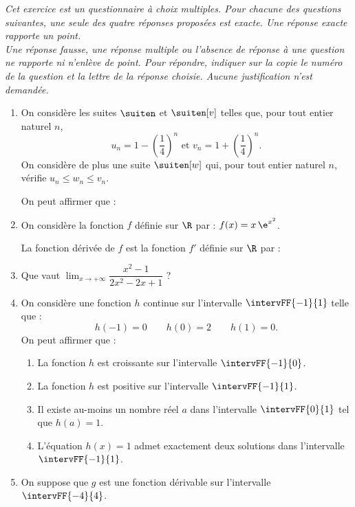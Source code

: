 \textit{Cet exercice est un questionnaire à choix multiples. Pour chacune des questions suivantes, une seule des quatre réponses proposées est exacte. Une réponse exacte rapporte un point.\\
	Une réponse fausse, une réponse multiple ou l’absence de réponse à une question ne rapporte ni n’enlève de point. Pour répondre, indiquer sur la copie le numéro de la question et la lettre de la réponse choisie. Aucune justification n’est demandée.}

\begin{enumerate}
	\item On considère les suites $\suiten$ et $\suiten[v]$ telles que, pour tout entier naturel $n$, \[ u_n=1-\left(\dfrac14\right)^n \text{ et } v_n = 1+\left(\dfrac14\right)^n. \]%
	On considère de plus une suite $\suiten[w]$ qui, pour tout entier naturel $n$, vérifie $u_n \leqslant w_n \leqslant v_n$.
	
	On peut affirmer que :
	
	\item On considère la fonction $f$ définie sur $\R$ par : $f(x)=x\,\e^{x^2}$.
	
	La fonction dérivée de $f$ est la fonction $f'$ définie sur $\R$ par :
	
	\item Que vaut $\displaystyle\lim_{x \to +\infty} \dfrac{x^2-1}{2x^2-2x+1}$ ?
	
	\item On considère une fonction $h$ continue sur l'intervalle $\intervFF{-1}{1}$ telle que : \[ h(-1)=0  \qquad h(0)=2 \qquad h(1)=0.\]%
	On peut affirmer que :
	\begin{enumerate}
		\item La fonction $h$ est croissante sur l'intervalle $\intervFF{-1}{0}$.
		\item La fonction $h$ est positive sur l'intervalle $\intervFF{-1}{1}$.
		\item Il existe au-moins un nombre réel $a$ dans l'intervalle $\intervFF{0}{1}$ tel que $h(a)=1$.
		\item L'équation $h(x)=1$ admet exactement deux solutions dans l'intervalle $\intervFF{-1}{1}$.
	\end{enumerate}
	\item On suppose que $g$ est une fonction dérivable sur l'intervalle $\intervFF{-4}{4}$.
	

\end{enumerate}
